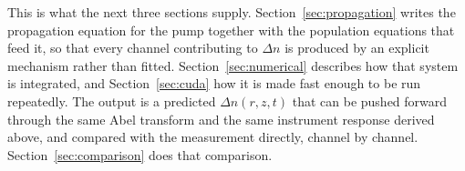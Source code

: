 This is what the next three sections supply. Section~\ref{sec:propagation} writes the propagation equation for the pump together with the population equations that feed it, so that every channel contributing to $\Delta n$ is produced by an explicit mechanism rather than fitted. Section~\ref{sec:numerical} describes how that system is integrated, and Section~\ref{sec:cuda} how it is made fast enough to be run repeatedly. The output is a predicted $\Delta n(r,z,t)$ that can be pushed forward through the same Abel transform and the same instrument response derived above, and compared with the measurement directly, channel by channel. Section~\ref{sec:comparison} does that comparison.

